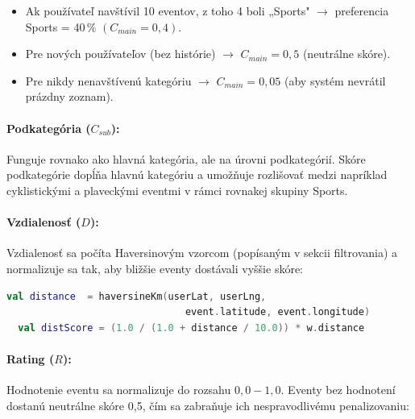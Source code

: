   \begin{itemize}[noitemsep, nolistsep]
      \item Ak používateľ navštívil 10 eventov, z toho 4 boli „Sports"
            $\rightarrow$ preferencia Sports = 40\,\% $(C_{main} = 0{,}4)$.
      \item Pre nových používateľov (bez histórie) $\rightarrow$                                                                                                                                                                   
            $C_{main} = 0{,}5$ (neutrálne skóre).
      \item Pre nikdy nenavštívenú kategóriu $\rightarrow$                                                                                                                                                                         
            $C_{main} = 0{,}05$ (aby systém nevrátil prázdny zoznam).
  \end{itemize}

  \paragraph{Podkategória ($C_{sub}$):}
  Funguje rovnako ako hlavná kategória, ale na úrovni podkategórií.
  Skóre podkategórie dopĺňa hlavnú kategóriu a umožňuje rozlišovať
  medzi napríklad cyklistickými a plaveckými eventmi v rámci rovnakej
  skupiny Sports.

  \paragraph{Vzdialenosť ($D$):}
  Vzdialenosť sa počíta Haversinovým vzorcom (popísaným v sekcii
  filtrovania) a normalizuje sa tak, aby bližšie eventy dostávali
  vyššie skóre:

  \begin{lstlisting}[language=Kotlin, caption=Výpočet skóre vzdialenosti]
  val distance  = haversineKm(userLat, userLng,
                               event.latitude, event.longitude)
  val distScore = (1.0 / (1.0 + distance / 10.0)) * w.distance
  \end{lstlisting}

  \paragraph{Rating ($R$):}
  Hodnotenie eventu sa normalizuje do rozsahu $0{,}0 - 1{,}0$. Eventy
  bez hodnotení dostanú neutrálne skóre 0,5, čím sa zabraňuje ich
  nespravodlivému penalizovaniu:

